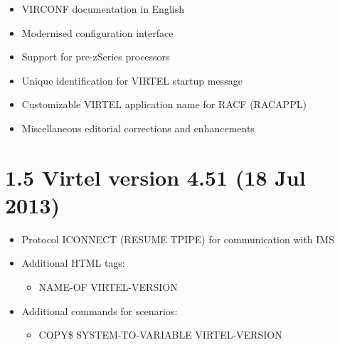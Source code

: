 \documentclass[letterpaper,10pt,english]{sphinxmanual}
\begin{document}
\begin{itemize}
\item {} 
VIRCONF documentation in English

\item {} 
Modernised configuration interface

\item {} 
Support for pre-zSeries processors

\item {} 
Unique identification for VIRTEL startup message

\item {} 
Customizable VIRTEL application name for RACF (RACAPPL)

\item {} 
Miscellaneous editorial corrections and enhancements

\end{itemize}


\section{1.5 Virtel version 4.51 (18 Jul 2013)}
\label{\detokenize{Installation_Guide:virtel-version-4-51-18-jul-2013}}
\begin{itemize}
\item {} 
Protocol ICONNECT (RESUME TPIPE) for communication with IMS

\end{itemize}

\begin{itemize}
\item {} 
Additional HTML tags:
\begin{itemize}
\item {} 
NAME-OF VIRTEL-VERSION

\end{itemize}

\end{itemize}

\begin{itemize}
\item {} 
Additional commands for scenarios:
\begin{itemize}
\item {} 
COPY\$ SYSTEM-TO-VARIABLE VIRTEL-VERSION

\end{itemize}

\end{itemize}
\end{document}
